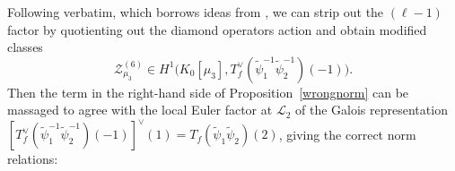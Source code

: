 \documentclass[10pt,letterpaper]{amsart}
\theoremstyle{plain}
\theoremstyle{definition}
\theoremstyle{definition}
\theoremstyle{plain}
\newtheorem{prop}[thm]{Proposition}
\theoremstyle{plain}
\theoremstyle{plain}
\theoremstyle{remark}
\numberwithin{equation}{section}
\DeclareMathOperator{\la}{\lambda}
\def\cL{{\mathcal L}}
\def\cO{\mathcal O}
\begin{document}
Following \cite[$\S{2.2}$]{CD} verbatim, which borrows ideas from \cite[$\S{1.4}$]{DR2}, we can strip out the $(\ell-1)$ factor by quotienting out the diamond operators action and obtain modified classes
\[
\mathcal{Z}_{\mu_3}^{(6)}\in H^1\bigl(K_0[\mu_3],T_f^{\vee}(\tilde{\psi}_{1}^{-1}\tilde{\psi}_{2}^{-1})(-1)\bigr).
\]
Then the term in the right-hand side of Proposition~\ref{wrongnorm} can be massaged to agree with the local Euler factor at $\cL_2$ of the Galois representation $[T_f^\vee(\tilde{\psi}_1^{-1}\tilde{\psi}_2^{-1})(-1)]^\vee(1)=T_f(\tilde{\psi}_1\tilde{\psi}_2)(2)$, giving the correct norm relations:

\end{document}
